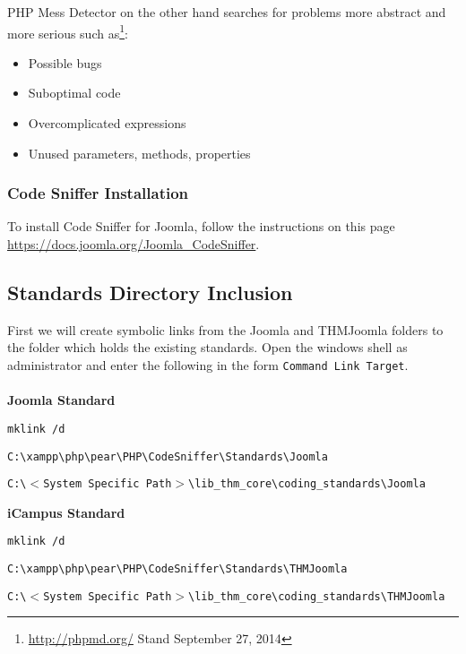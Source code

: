 \noindent
PHP Mess Detector on the other hand searches for problems more abstract and more serious such as\footnote{\url{http://phpmd.org/} Stand September 27, 2014}:

\begin{itemize}
	\item Possible bugs
	\item Suboptimal code
	\item Overcomplicated expressions
	\item Unused parameters, methods, properties
\end{itemize}

\subsubsection{Code Sniffer Installation}
To install Code Sniffer for Joomla, follow the instructions on this page
\url{https://docs.joomla.org/Joomla_CodeSniffer}.

\newpage

\subsection{Standards Directory Inclusion}

First we will create symbolic links from the Joomla and THMJoomla folders to the folder which holds the existing standards. Open the windows shell as administrator and enter the following in the form \texttt{Command Link Target}.\\
\\
\textbf{Joomla Standard}
\begin{description}
	\itemsep-10pt
	\item[Command] \texttt{mklink /d}\\
	\item[Link] \texttt{C:\textbackslash xampp\textbackslash php\textbackslash pear\textbackslash PHP\textbackslash CodeSniffer\textbackslash Standards\textbackslash Joomla}\\
	\item[Target] \texttt{C:\textbackslash $<$System Specific Path$>$\textbackslash lib\_thm\_core\textbackslash coding\_standards\textbackslash Joomla}\\
\end{description}

\noindent
\textbf{iCampus Standard}
\begin{description}
	\itemsep-10pt
	\item[Command] \texttt{mklink /d}\\
	\item[Link] \texttt{C:\textbackslash xampp\textbackslash php\textbackslash pear\textbackslash PHP\textbackslash CodeSniffer\textbackslash Standards\textbackslash THMJoomla}\\
	\item[Target] \texttt{C:\textbackslash $<$System Specific Path$>$\textbackslash lib\_thm\_core\textbackslash coding\_standards\textbackslash THMJoomla}\\
\end{description}


